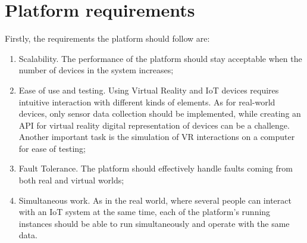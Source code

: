 \section{Platform requirements}
Firstly, the requirements the platform should follow are:
\begin{enumerate}
\item Scalability. The performance of the platform should stay acceptable when the number of devices in the system increases;
\item Ease of use and testing. Using Virtual Reality and IoT devices requires intuitive interaction with different kinds of elements. As for real-world devices, only sensor data collection should be implemented, while creating an API for virtual reality digital representation of devices can be a challenge. Another important task is the simulation of VR interactions on a computer for ease of testing;
\item Fault Tolerance. The platform should effectively handle faults coming from both real and virtual worlds;
\item Simultaneous work. As in the real world, where several people can interact with an IoT system at the same time, each of the platform's running instances should be able to run simultaneously and operate with the same data.
\end{enumerate}

